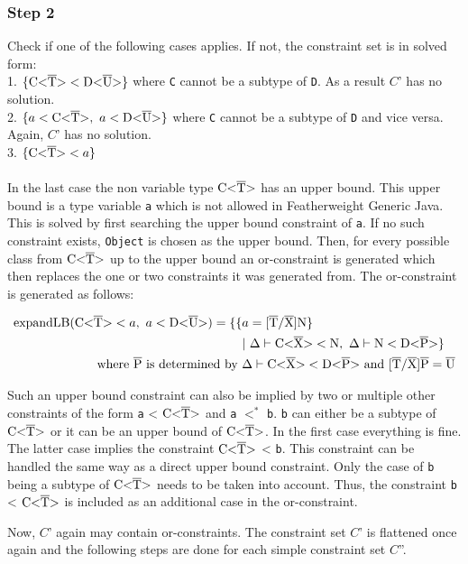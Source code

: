 \subsubsection{Step 2}
Check if one of the following cases applies. If not, the constraint set is in solved form:\\
1. $\{ \text{C<}\overline{\text{T}}\text{>} < \text{D<}\overline{\text{U}}\text{>} \}$ where \verb|C| cannot be a subtype of \verb|D|. As a result $C$' has no solution.\\
2. $\{ a < \text{C<}\overline{\text{T}}\text{>}, \ a < \text{D<}\overline{\text{U}}\text{>} \}$ where \verb|C| cannot be a subtype of \verb|D| and vice versa. Again, $C$' has no solution.\\
3. $\{ \text{C<}\overline{\text{T}}\text{>} < a \}$\\
\\
In the last case the non variable type $\text{C<}\overline{\text{T}}\text{>}$ has an upper bound. This upper bound is a type variable \verb|a| which is not allowed in Featherweight Generic Java.
This is solved by first searching the upper bound constraint of \verb|a|. If no such constraint exists, \verb|Object| is chosen as the upper bound. Then, for every possible class
from $\text{C<}\overline{\text{T}}\text{>}$ up to the upper bound an or-constraint is generated which then replaces the one or two constraints it was generated from.
The or-constraint is generated as follows:

\begin{align*}
    \text{expandLB} ( \text{C<}\overline{\text{T}}\text{>} < a, \ a < \text{D<}\overline{\text{U}}\text{>} ) = \{ \{ &a = \text{[}\overline{\text{T}}/\overline{\text{X}}\text{]N} \} \\
     &| \ \Delta \vdash \text{C<}\overline{\text{X}}\text{>} < \text{N}, \ \Delta \vdash \text{N} < \text{D<}\overline{\text{P}}\text{>} \}\\
    \text{where} \ \overline{\text{P}} \ \text{is determined by } & \Delta \vdash \text{C<}\overline{\text{X}}\text{>} < \text{D<}\overline{\text{P}}\text{>} \ \text{and} \ \text{[}\overline{\text{T}}/\overline{\text{X}}\text{]}\overline{\text{P}} = \overline{\text{U}}\\
\end{align*}

Such an upper bound constraint can also be implied by two or multiple other constraints of the form \verb|a| < $\text{C<}\overline{\text{T}}\text{>}$ and \verb|a| $<^*$ \verb|b|. \verb|b| can either be a subtype of $\text{C<}\overline{\text{T}}\text{>}$ or it can be an upper bound of $\text{C<}\overline{\text{T}}\text{>}$. In the first case everything is fine.
The latter case implies the constraint $\text{C<}\overline{\text{T}}\text{>}$ < \verb|b|. This constraint can be handled the same way as a direct upper bound constraint. Only the case of \verb|b| being a subtype of $\text{C<}\overline{\text{T}}\text{>}$ needs to be taken into account. Thus, the constraint \verb|b| < $\text{C<}\overline{\text{T}}\text{>}$ is included as an additional case in the or-constraint.

Now, $C$' again may contain or-constraints. The constraint set $C$' is flattened once again and the following steps are done for each simple constraint set $C$''.

